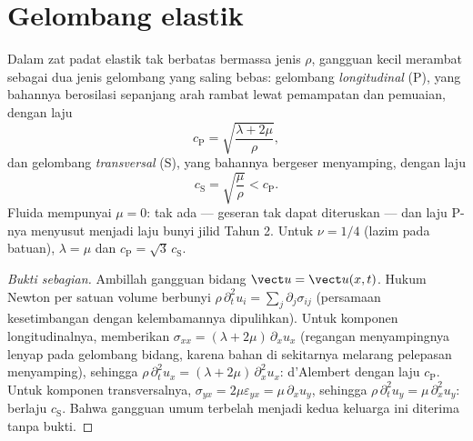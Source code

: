 \section{Gelombang elastik}

\begin{proposition}\label{prop:b3:continuum-elasticity:waves}
Dalam zat padat elastik tak berbatas bermassa jenis $\rho$, gangguan
kecil merambat sebagai dua jenis gelombang yang saling bebas: gelombang
\emph{longitudinal} (P), yang bahannya berosilasi sepanjang arah rambat
lewat pemampatan dan pemuaian, dengan laju
\[
c_{\text{P}} = \sqrt{\frac{\lambda + 2\mu}{\rho}} ,
\]
dan gelombang \emph{transversal} (S), yang bahannya bergeser menyamping,
dengan laju
\[
c_{\text{S}} = \sqrt{\frac{\mu}{\rho}} < c_{\text{P}} .
\]
Fluida mempunyai $\mu = 0$: tak ada  --- geseran tak dapat
diteruskan --- dan laju P-nya menyusut menjadi laju bunyi jilid Tahun 2.
Untuk $\nu = 1/4$ (lazim pada batuan), $\lambda = \mu$ dan $c_{\text{P}} =
\sqrt3\,c_{\text{S}}$.
\end{proposition}

\begin{proof}[Bukti sebagian]
Ambillah gangguan bidang $\vect u = \vect u(x, t)$. Hukum Newton per
satuan volume berbunyi $\rho\,\partial_t^2u_i = \sum_j\partial_j\sigma_{ij}$
(persamaan kesetimbangan dengan kelembamannya dipulihkan). Untuk
komponen longitudinalnya,  memberikan $\sigma_{xx} = (\lambda +
2\mu)\,\partial_xu_x$ (regangan menyampingnya lenyap pada gelombang
bidang, karena bahan di sekitarnya melarang pelepasan menyamping),
sehingga
$\rho\,\partial_t^2u_x = (\lambda + 2\mu)\,\partial_x^2u_x$: d'Alembert
dengan laju $c_{\text{P}}$. Untuk komponen transversalnya, $\sigma_{yx} =
2\mu\varepsilon_{yx} = \mu\,\partial_xu_y$, sehingga
$\rho\,\partial_t^2u_y = \mu\,\partial_x^2u_y$: berlaju $c_{\text{S}}$.
Bahwa gangguan umum terbelah menjadi kedua keluarga ini diterima tanpa bukti.
\end{proof}

